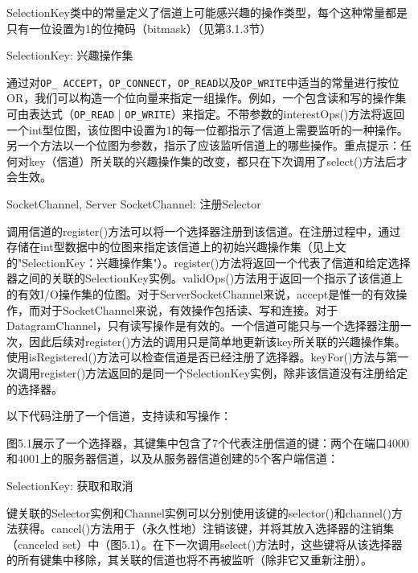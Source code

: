 		SelectionKey类中的常量定义了信道上可能感兴趣的操作类型，每个这种常量都是只有一位设置为1的位掩码（bitmask）（见第3.1.3节） 

		SelectionKey: 兴趣操作集 

		

		通过对\verb|OP_ ACCEPT|，\verb|OP_CONNECT|，\verb|OP_READ|以及\verb|OP_WRITE|中适当的常量进行按位OR，我们可以构造一个位向量来指定一组操作。例如，一个包含读和写的操作集可由表达式（\verb|OP_READ| | \verb|OP_WRITE|）来指定。不带参数的interestOps()方法将返回一个int型位图，该位图中设置为1的每一位都指示了信道上需要监听的一种操作。另一个方法以一个位图为参数，指示了应该监听信道上的哪些操作。重点提示：任何对key（信道）所关联的兴趣操作集的改变，都只在下次调用了select()方法后才会生效。 

		SocketChannel, Server SocketChannel: 注册Selector 

		

		调用信道的register()方法可以将一个选择器注册到该信道。在注册过程中，通过存储在int型数据中的位图来指定该信道上的初始兴趣操作集（见上文的"SelectionKey：兴趣操作集"）。register()方法将返回一个代表了信道和给定选择器之间的关联的SelectionKey实例。validOps()方法用于返回一个指示了该信道上的有效I/O操作集的位图。对于ServerSocketChannel来说，accept是惟一的有效操作，而对于SocketChannel来说，有效操作包括读、写和连接。对于DatagramChannel，只有读写操作是有效的。一个信道可能只与一个选择器注册一次，因此后续对register()方法的调用只是简单地更新该key所关联的兴趣操作集。使用isRegistered()方法可以检查信道是否已经注册了选择器。keyFor()方法与第一次调用register()方法返回的是同一个SelectionKey实例，除非该信道没有注册给定的选择器。 

		以下代码注册了一个信道，支持读和写操作： 

		

		图5.1展示了一个选择器，其键集中包含了7个代表注册信道的键：两个在端口4000和4001上的服务器信道，以及从服务器信道创建的5个客户端信道： 

		SelectionKey: 获取和取消 

		

		键关联的Selector实例和Channel实例可以分别使用该键的selector()和channel()方法获得。cancel()方法用于（永久性地）注销该键，并将其放入选择器的注销集（canceled set）中（图5.1）。在下一次调用select()方法时，这些键将从该选择器的所有键集中移除，其关联的信道也将不再被监听（除非它又重新注册）。 

